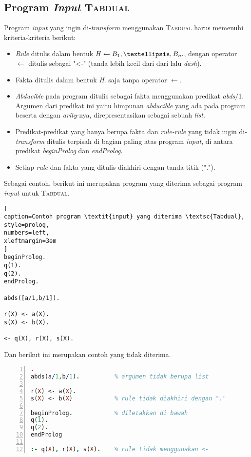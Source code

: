 \subsection{Program \textit{Input} \textsc{Tabdual}}
Program \textit{input} yang ingin di-\textit{transform} menggunakan \textsc{Tabdual} harus memenuhi kriteria-kriteria berikut:

\begin{itemize}
	\item \textit{Rule} ditulis dalam bentuk \textit{H $\leftarrow B_1, \textellipsis,B_n.$}, dengan operator $\leftarrow$ ditulis sebagai "<-" (tanda lebih kecil dari dari lalu \textit{dash}).
	\item Fakta ditulis dalam bentuk \textit{H}. saja tanpa operator $\leftarrow$.
	\item \textit{Abducible} pada program ditulis sebagai fakta menggunakan predikat \textit{abds$/$}1. Argumen dari predikat ini yaitu himpunan \textit{abducible} yang ada pada program beserta dengan \textit{arity}-nya, direpresentasikan sebagai sebuah \textit{list}.
	\item Predikat-predikat yang hanya berupa fakta dan \textit{rule-rule} yang tidak ingin di-\textit{transform} ditulis terpisah di bagian paling atas program \textit{input}, di antara predikat \textit{beginProlog} dan \textit{endProlog}. 
	\item Setiap \textit{rule} dan fakta yang ditulis diakhiri dengan tanda titik (".").
\end{itemize}

\noindent Sebagai contoh, berikut ini merupakan program yang diterima sebagai program \textit{input} untuk \textsc{Tabdual}.
\\

\begin{lstlisting}[
caption=Contoh program \textit{input} yang diterima \textsc{Tabdual},
style=prolog,
numbers=left,
xleftmargin=3em
]
beginProlog.
q(1).
q(2).
endProlog.

abds([a/1,b/1]).

r(X) <- a(X).
s(X) <- b(X).

<- q(X), r(X), s(X).
\end{lstlisting}

\noindent Dan berikut ini merupakan contoh yang tidak diterima.
\\

\begin{lstlisting}[language=Prolog,
caption=Contoh program \textit{input} yang tidak diterima \textsc{Tabdual},
style=prolog,
numbers=left,
xleftmargin=3em
].
abds(a/1,b/1).			% argumen tidak berupa list

r(X) <- a(X).
s(X) <- b(X)			% rule tidak diakhiri dengan "."

beginProlog.			% diletakkan di bawah
q(1).
q(2).
endProlog

:- q(X), r(X), s(X).	% rule tidak menggunakan <-
\end{lstlisting}

